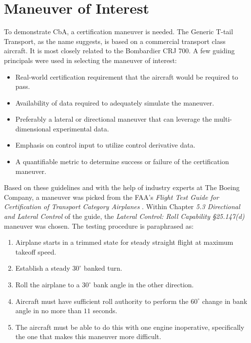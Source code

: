 \section{Maneuver of Interest} \label{sec:maneuver}

To demonstrate CbA, a certification maneuver is needed.
The Generic T-tail Transport, as the name suggests, is based on a commercial transport class aircraft.
It is most closely related to the Bombardier CRJ 700.
A few guiding principals were used in selecting the maneuver of interest:
\begin{itemize}
    \item Real-world certification requirement that the aircraft would be required to pass.
    \item Availability of data required to adequately simulate the maneuver.
    \item Preferably a lateral or directional maneuver that can leverage the multi-dimensional experimental data.
    \item Emphasis on control input to utilize control derivative data.
    \item A quantifiable metric to determine success or failure of the certification maneuver.
\end{itemize}

Based on these guidelines and with the help of industry experts at The Boeing Company, a maneuver was picked from the FAA's \textit{Flight Test Guide for Certification of Transport Category Airplanes} \cite{romanowski_flight_2018}.
Within Chapter \textit{5.3 Directional and Lateral Control} of the guide, the \textit{Lateral Control: Roll Capability \S 25.147(d)} maneuver was chosen.   
The testing procedure is paraphrased as: 
\begin{enumerate}
    \item Airplane starts in a trimmed state for steady straight flight at maximum takeoff speed.
    \item Establish a steady $30^\circ$ banked turn.
    \item Roll the airplane to a $30^\circ$ bank angle in the other direction.
    \item Aircraft must have sufficient roll authority to perform the $60^\circ$ change in bank angle in no more than $11$ seconds. 
    \item The aircraft must be able to do this with one engine inoperative, specifically the one that makes this maneuver more difficult.

\end{enumerate}


